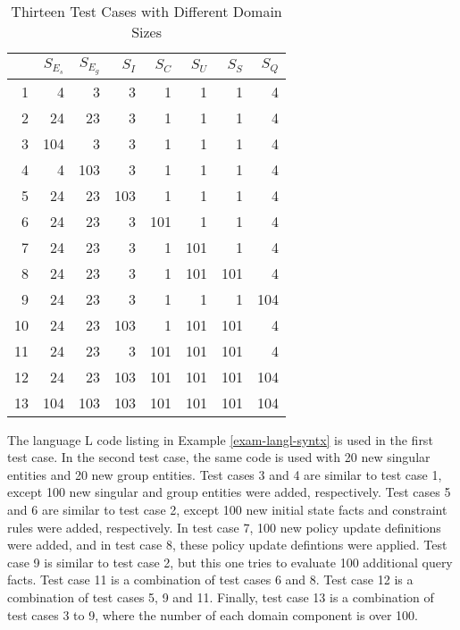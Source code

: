 \documentclass[11pt]{report}
\begin{document}
      \begin{table}[tbhp]
        \begin{center}
          \begin{tabular}[t]{|r|r|r|r|r|r|r|r|}
            \hline
            &
            \textbf{$S_{E_{s}}$} &
            \textbf{$S_{E_{g}}$} &
            \textbf{$S_{I}$} &
            \textbf{$S_{C}$} &
            \textbf{$S_{U}$} &
            \textbf{$S_{S}$} &
            \textbf{$S_{Q}$} \\
            \hline
            1 & 4 & 3 & 3 & 1 & 1 & 1 & 4 \\
            \hline
            2 & 24 & 23 & 3 & 1 & 1 & 1 & 4 \\
            \hline
            3 & 104 & 3 & 3 & 1 & 1 & 1 & 4 \\
            \hline
            4 & 4 & 103 & 3 & 1 & 1 & 1 & 4 \\
            \hline
            5 & 24 & 23 & 103 & 1 & 1 & 1 & 4 \\
            \hline
            6 & 24 & 23 & 3 & 101 & 1 & 1 & 4 \\
            \hline
            7 & 24 & 23 & 3 & 1 & 101 & 1 & 4 \\
            \hline
            8 & 24 & 23 & 3 & 1 & 101 & 101 & 4 \\
            \hline
            9 & 24 & 23 & 3 & 1 & 1 & 1 & 104 \\
            \hline
            10 & 24 & 23 & 103 & 1 & 101 & 101 & 4 \\
            \hline
            11 & 24 & 23 & 3 & 101 & 101 & 101 & 4 \\
            \hline
            12 & 24 & 23 & 103 & 101 & 101 & 101 & 104 \\
            \hline
            13 & 104 & 103 & 103 & 101 & 101 & 101 & 104 \\
            \hline
          \end{tabular}
        \end{center}
        \caption{Thirteen Test Cases with Different Domain Sizes}
        \label{tabl-polup-tedom}
      \end{table}

      The language {\cal L} code listing in Example \ref{exam-langl-syntx} is
      used in the first test case. In the second test case, the same code is
      used with 20 new singular entities and 20 new group entities. Test cases
      3 and 4 are similar to test case 1, except 100 new singular and group
      entities were added, respectively. Test cases 5 and 6 are similar to test
      case 2, except 100 new initial state facts and constraint rules were
      added, respectively. In test case 7, 100 new policy update definitions
      were added, and in test case 8, these policy update defintions were
      applied. Test case 9 is similar to test case 2, but this one tries to
      evaluate 100 additional query facts. Test case 11 is a combination of
      test cases 6 and 8. Test case 12 is a combination of test cases 5, 9
      and 11. Finally, test case 13 is a combination of test cases 3 to 9,
      where the number of each domain component is over 100.
\end{document}
